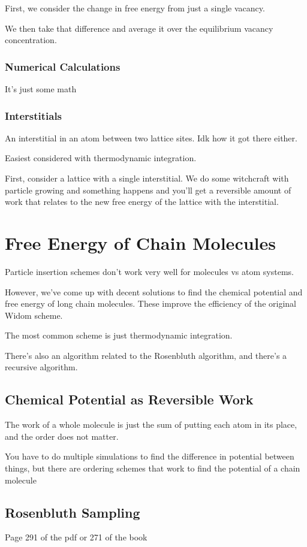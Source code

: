 \documentclass[fleqn]{report}
\begin{document}
First, we consider the change in free energy from just a single vacancy. 

We then take that difference and average it over the equilibrium 
vacancy concentration. 

\subsection{Numerical Calculations}
It's just some math 

\subsection{Interstitials}
An interstitial in an atom between two lattice sites. Idk how it got 
there either.

Easiest considered with thermodynamic integration. 

First, consider a lattice with a single interstitial. We do some witchcraft 
with particle growing and something happens and you'll get a reversible 
amount of work that relates to the new free energy of the lattice with the 
interstitial. 

\chapter{Free Energy of Chain Molecules}
Particle insertion schemes don't work very well for molecules vs atom systems. 

However, we've come up with decent solutions to find the chemical potential 
and free energy of long chain molecules. These improve the efficiency 
of the original Widom scheme. 

The most common scheme is just thermodynamic integration. 

There's also an algorithm related to the Rosenbluth algorithm, and there's a 
recursive algorithm. 

\section{Chemical Potential as Reversible Work}
The work of a whole molecule is just the sum of putting each atom in its place, 
and the order does not matter. 

You have to do multiple simulations to find the difference in potential between 
things, but there are ordering schemes that work to find the potential of 
a chain molecule 

\section{Rosenbluth Sampling}
Page 291 of the pdf or 271 of the book 
\end{document}
